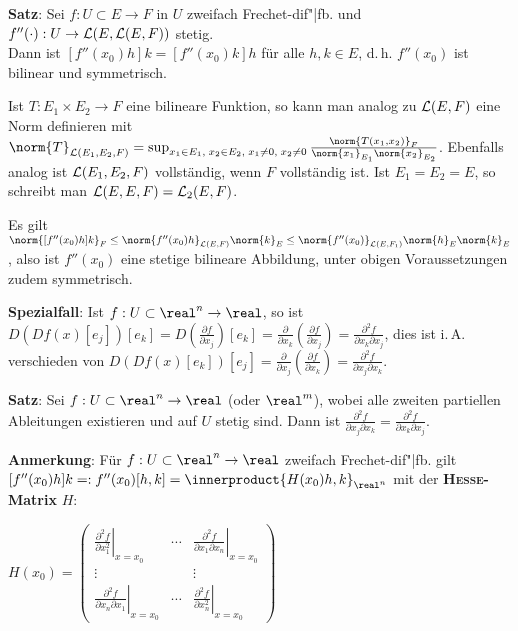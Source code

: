 \textbf{Satz}:
Sei $f: U \subset E \rightarrow F$ in $U$ zweifach Frechet-dif"|fb.
und $f''(\cdot): U \rightarrow \mathcal{L}(E, \mathcal{L}(E, F))$ stetig. \\
Dann ist $[f''(x_0)h]k = [f''(x_0)k]h$ für alle $h, k \in E$, d.\,h.
$f''(x_0)$ ist bilinear und symmetrisch.

Ist $T: E_1 \times E_2 \rightarrow F$ eine bilineare Funktion, so kann
man analog zu $\mathcal{L}(E, F)$ eine Norm definieren mit
$\norm{T}_{\L(E_1, E_2, F)} =
\sup_{x_1 \in E_1,\; x_2 \in E_2,\; x_1 \not= 0,\; x_2 \not= 0}
\frac{\norm{T(x_1, x_2)}_F}{\norm{x_1}_{E_1} \norm{x_2}_{E_2}}$.
Ebenfalls analog ist $\mathcal{L}(E_1, E_2, F)$ vollständig, wenn $F$ vollständig ist.
Ist $E_1 = E_2 = E$, so schreibt man $\mathcal{L}(E, E, F) = \mathcal{L}_2(E, F)$.

Es gilt $\norm{[f''(x_0)h]k}_F \le \norm{f''(x_0)h}_{\L(E, F)} \norm{k}_E \le
\norm{f''(x_0)}_{\L(E, F_1)} \norm{h}_E \norm{k}_E$, also ist
$f''(x_0)$ eine stetige bilineare Abbildung,
unter obigen Voraussetzungen zudem symmetrisch.

\linie

\textbf{Spezialfall}:
Ist $f: U \subset \real^n \rightarrow \real$, so ist
$D(Df(x)[e_j])[e_k] = D(\frac{\partial f}{\partial x_j})[e_k] =
\frac{\partial}{\partial x_k} \left(\frac{\partial f}{\partial x_j}\right) =
\frac{\partial^2 f}{\partial x_k \partial x_j}$, dies ist i.\,A.
verschieden von $D(Df(x)[e_k])[e_j] =
\frac{\partial}{\partial x_j} \left(\frac{\partial f}{\partial x_k}\right) =
\frac{\partial^2 f}{\partial x_j \partial x_k}$.

\textbf{Satz}:
Sei $f: U \subset \real^n \rightarrow \real$ (oder $\real^m$),
wobei alle zweiten partiellen Ableitungen existieren und auf $U$ stetig
sind.
Dann ist $\frac{\partial^2 f}{\partial x_j \partial x_k} =
\frac{\partial^2 f}{\partial x_k \partial x_j}$.

\textbf{Anmerkung}:
Für $f: U \subset \real^n \rightarrow \real$ zweifach Frechet-dif"|fb. gilt
$[f''(x_0)h]k =: f''(x_0)[h, k] = \innerproduct{H(x_0)h, k}_{\real^n}$ mit
der \textbf{\textsc{Hesse}-Matrix} $H$:

$H(x_0) = \begin{pmatrix}
\left.\frac{\partial^2 f}{\partial x_1^2}\right|_{x=x_0} &
\cdots &
\left.\frac{\partial^2 f}{\partial x_1 \partial x_n}\right|_{x=x_0} \\
\vdots & & \vdots \\
\left.\frac{\partial^2 f}{\partial x_n \partial x_1}\right|_{x=x_0} &
\cdots &
\left.\frac{\partial^2 f}{\partial x_n^2}\right|_{x=x_0}
\end{pmatrix}$

